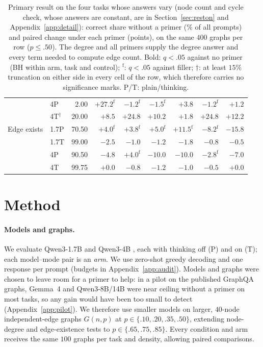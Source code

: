 \documentclass[11pt]{article}
\begin{document}
\begin{table}[t]
\begin{tabular}{llrrrrrrr}
 & 4P & 2.00 & $\mathbf{+27.2}^{\mathrm{f}}$ & $-1.2^{\mathrm{f}}$ & $-1.5^{\mathrm{f}}$ & $\mathbf{+3.8}$ & $-1.2^{\mathrm{f}}$ & $+1.2$\\ %
 & 4T$^{\dagger}$ & 20.00 & $+8.5$ & $+24.8$ & $+10.2$ & $+1.8$ & $+24.8$ & $+12.2$\\ %
\midrule
Edge exists & 1.7P & 70.50 & $+4.0^{\mathrm{f}}$ & $+3.8^{\mathrm{f}}$ & $+5.0^{\mathrm{f}}$ & $\mathbf{+11.5}^{\mathrm{f}}$ & $\mathbf{-8.2}^{\mathrm{f}}$ & $\mathbf{-15.8}$\\ %
 & 1.7T & 99.00 & $-2.5$ & $-1.0$ & $-1.2$ & $-1.8$ & $-0.8$ & $-0.5$\\ %
 & 4P & 90.50 & $\mathbf{-4.8}$ & $\mathbf{+4.0}^{\mathrm{f}}$ & $\mathbf{-10.0}$ & $\mathbf{-10.0}$ & $-2.8^{\mathrm{f}}$ & $\mathbf{-7.0}$\\ %
 & 4T & 99.75 & $+0.0$ & $-0.8$ & $-1.2$ & $-1.0$ & $-0.5$ & $+0.0$\\ %
\bottomrule
\end{tabular}
\caption{Primary result on the four tasks whose answers vary (node count and cycle check, whose answers are constant, are in Section~\ref{sec:reston} and Appendix~\ref{app:detail}): correct share without a primer (\% of all prompts) and paired change under each primer (points), on the same $400$ graphs per row ($p\leq.50$). The degree and all primers supply the degree answer and every term needed to compute edge count. Bold: $q<.05$ against no primer (BH within arm, task and control); $^{\mathrm{f}}$: $q<.05$ against filler; $\dagger$: at least $15\%$ truncation on either side in every cell of the row, which therefore carries no significance marks. P/T: plain/thinking.} %
\label{tab:matrix}
\end{table}

\section{Method}
\label{sec:method}
\paragraph{Models and graphs.} We evaluate Qwen3-1.7B and Qwen3-4B \citep{qwen2025qwen3}, each with thinking off (P) and on (T); each model--mode pair is an \emph{arm}. We use zero-shot greedy decoding and one response per prompt (budgets in Appendix~\ref{app:audit}). Models and graphs were chosen to leave room for a primer to help: in a pilot on the published GraphQA graphs, Gemma~4 \citep{gemma4} and Qwen3-8B/14B were near ceiling without a primer on most tasks, so any gain would have been too small to detect (Appendix~\ref{app:pilot}). We therefore use smaller models on larger, $40$-node independent-edge graphs $G(n,p)$ \citep{gilbert1959random} at $p\in\{.10,.20,.35,.50\}$, extending node-degree and edge-existence tests to $p\in\{.65,.75,.85\}$. Every condition and arm receives the same $100$ graphs per task and density, allowing paired comparisons. %
\end{document}
